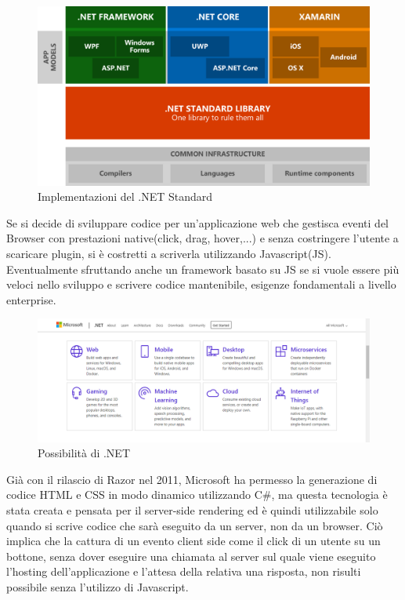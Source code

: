 \begin{figure}[H]
	\centerline{\includegraphics[scale=0.2]{figure/DotNetImplementations}}
	\caption{Implementazioni del .NET Standard}
	\label{fig:DotNetImplementations}
\end{figure}

Se si decide di sviluppare codice per un'applicazione web che gestisca eventi del Browser con prestazioni native(click, drag, hover,...) e senza costringere l'utente a scaricare plugin, si \`e costretti a scriverla utilizzando Javascript(JS).
Eventualmente sfruttando anche un framework basato su JS se si vuole essere pi\`u veloci nello sviluppo e scrivere codice mantenibile, esigenze fondamentali a livello enterprise.

\begin{figure}[H]
\centerline{\includegraphics[scale=0.35]{figure/DotNetFrameworkCapabilities}}
\caption{Possibilit\`a di .NET}
\label{fig:DotNetCapabilities}
\end{figure}

Gi\`a con il rilascio di Razor\cite{razor} nel 2011, Microsoft ha permesso la generazione di codice HTML e CSS in modo dinamico utilizzando C\#, ma questa tecnologia \`e stata creata e pensata per il server-side rendering ed \`e quindi utilizzabile solo quando si scrive codice che sar\`a eseguito da un server, non da un browser.
Ci\`o implica che la cattura di un evento client side come il click di un utente su un bottone, senza dover eseguire una chiamata al server sul quale viene eseguito l'hosting dell'applicazione e l'attesa della relativa una risposta, non risulti possibile senza l'utilizzo di Javascript.

